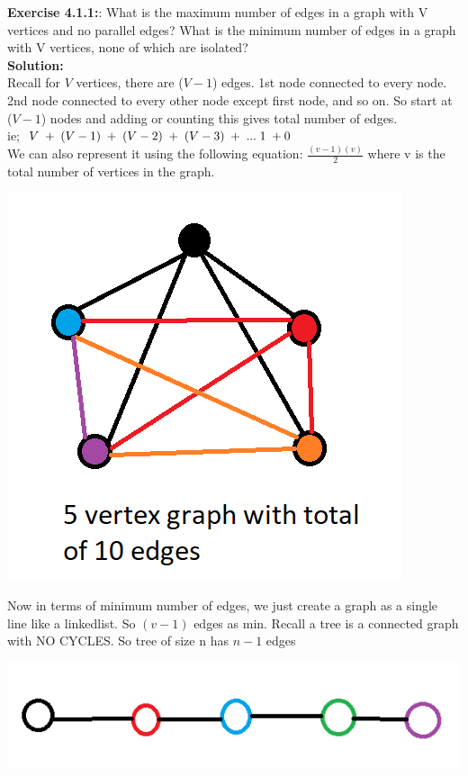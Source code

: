 \documentclass[11pt,fleqn]{article}
\begin{document}
\textbf{Exercise 4.1.1:}: What is the maximum number of edges in a graph with V vertices and no parallel
edges? What is the minimum number of edges in a graph with V vertices, none of
which are isolated?\\

\textbf{Solution:}\\
Recall for $V$ vertices, there are ($V-1$) edges. 1st node connected to every node. 2nd node connected to every other node except first node, and so on. So start at ($V-1$) nodes and adding or counting this gives total number of edges.\\

ie; $V \thickspace + \thickspace (V-1) \thickspace + \thickspace (V-2) \thickspace + \thickspace (V-3) \thickspace + \thickspace ... \thickspace 1 \thickspace + 0$\\

We can also represent it using the following equation: $\frac{(v-1)(v)}{2}$ where v is the total number of vertices in the graph.

\begin{center}
	\includegraphics[scale=1]{4.1.1.png}
\end{center}

Now in terms of minimum number of edges, we just create a graph as a single line like a linkedlist. So $(v-1)$ edges as min. Recall a tree is a connected graph with NO CYCLES. So tree of size n has $n-1$ edges

\begin{center}
	\includegraphics[scale=1]{4.1.1-soln.png}
\end{center}
	
\end{document}
